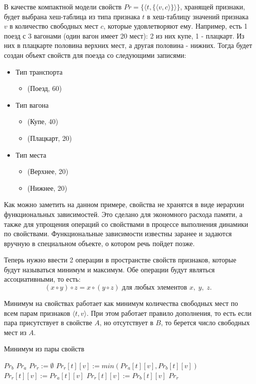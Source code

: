В качестве компактной модели свойств $Pr=\{\langle t,\{\langle v, c \rangle \} \rangle\}$, хранящей признаки, будет выбрана хеш-таблица из типа признака $t$ в хеш-таблицу значений признака $v$ в количество свободных мест $c$, которые удовлетворяют ему. Например, есть 1 поезд с 3 вагонами (один вагон имеет 20 мест): 2 из них купе, 1 - плацкарт. Из них в плацкарте половина верхних мест, а другая половина - нижних. Тогда будет создан объект свойств для поезда со следующими записями:
\begin{itemize}
	\item Тип транспорта
	\begin{itemize}
		\item (Поезд, 60)
	\end{itemize}
	\item Тип вагона
	\begin{itemize}
		\item (Купе, 40)
		\item (Плацкарт, 20)
	\end{itemize}
	\item Тип места
	\begin{itemize}
		\item (Верхнее, 20)
		\item (Нижнее, 20)
	\end{itemize}
\end{itemize}

Как можно заметить на данном примере, свойства не хранятся в виде иерархии функциональных зависимостей. Это сделано для экономного расхода памяти, а также для упрощения операций со свойствами в процессе выполнения динамики по свойствами. Функциональные зависимости известны заранее и задаются вручную в специальном объекте, о котором речь пойдет позже.

Теперь нужно ввести 2 операции в пространстве свойств признаков, которые будут называться минимум и максимум. Обе операции будут являться ассоциативными, то есть:
\[
(x\circ y)\circ z=x\circ(y\circ z)\text{ для любых элементов }x,\;y,\;z.
\]

Минимум на свойствах работает как минимум количества свободных мест по всем парам признаков $\langle t, v \rangle$. При этом работает правило дополнения, то есть если пара присутствует в свойстве $A$, но отсутствует в $B$, то берется число свободных мест из $A$.

\begin{algorithm}[!h]
	\caption{Минимум из пары свойств}\label{lst5}
	\begin{algorithmic}
			\State \Return $Pr_b$
		\EndIf
		\State \Return $Pr_a$
		\EndIf
		\State $Pr_r := \emptyset$ 
			\State $Pr_r[t][v] := min(Pr_a[t][v], Pr_b[t][v])$
		\EndFor
			\State $Pr_r[t][v] := Pr_a[t][v]$
		\EndFor
			\State $Pr_r[t][v] := Pr_b[t][v]$
		\EndFor
		\State \Return $Pr_r$
		\EndFunction
	\end{algorithmic}
\end{algorithm}


